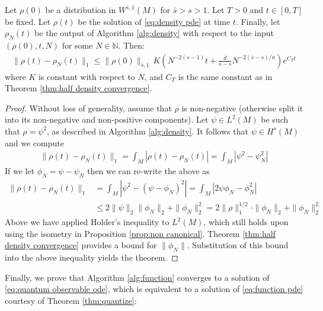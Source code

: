 \documentclass[final,leqno]{siamart}
\begin{document}
\begin{theorem} \label{thm:density convergence}
	Let $\rho(0)$ be a distribution in $W^{\bar{s},1}(M)$ for $\bar{s} > s >1$.
	Let $T > 0$ and $t \in [0,T]$ be fixed.
	Let $\rho(t)$ be the solution of \eqref{eq:density pde} at time $t$.
	Finally, let $\rho_{N}(t)$ be the output of Algorithm \ref{alg:density} with respect to the input $(\rho(0), t , N)$ for some $N \in \mathbb{N}$.
	Then:
	\begin{align*}
		\| \rho(t) - \rho_{N}(t) \|_{1} \leq \| \rho(0) \|_{\bar{s},1} \, K \left( N^{-2(s-1)} t+  \frac{d}{\bar{s}-s} N^{-2(\bar{s}-s)/n} \right) e^{C_{T} t}
	\end{align*}
	where $K$ is constant with respect to $N$, and $C_{T}$ is the same constant as in Theorem \ref{thm:half density convergence}.
\end{theorem}

\begin{proof}
	Without loss of generality, assume that $\rho$ is non-negative (otherwise split it into its non-negative and non-positive components).
	Let $\psi \in L^{2}(M)$ be such that $\rho =  \psi ^{2}$, as described in Algorithm \ref{alg:density}.
	It follows that $\psi \in H^{s}(M)$ and we compute
	\begin{align*}
		\| \rho(t) - \rho_{N}(t) \|_{1} = \int_{M} | \rho(t) - \rho_{N}(t)| = \int_{M} | \psi^{2} - \psi_{N}^{2} |
	\end{align*}
	If we let $\phi_{N} = \psi - \psi_{N}$ then we can re-write the above as
	\begin{align*}
		\| \rho(t) - \rho_{N}(t) \|_{1}  &= \int_{M} | \psi^{2} - (\psi - \phi_{N})^{2} | = \int_{M} | 2 \psi \phi_{N} - \phi_{N}^{2} | \\
			&\leq 2 \| \psi \|_{2} \| \phi_{N}\|_{2} + \| \phi_{N} \|_{2}^{2} = 2 \| \rho \|_{1}^{1/2} \cdot \| \phi_{N} \|_{2} + \| \phi_{N} \|_{2}^{2}
	\end{align*}
	Above we have applied Holder's inequality to $L^{2}(M)$, which still holds upon using the isometry in Proposition \ref{prop:non canonical}.
	Theorem \ref{thm:half density convergence} provides a bound for $\| \phi_{N} \|$.
	Substitution of this bound into the above inequality yields the theorem.
\end{proof}

Finally, we prove that Algorithm \ref{alg:function} converges to a solution of \eqref{eq:quantum observable ode}, which is equivalent to a solution of \eqref{eq:function pde} courtesy of Theorem \ref{thm:quantize}:
\end{document}

